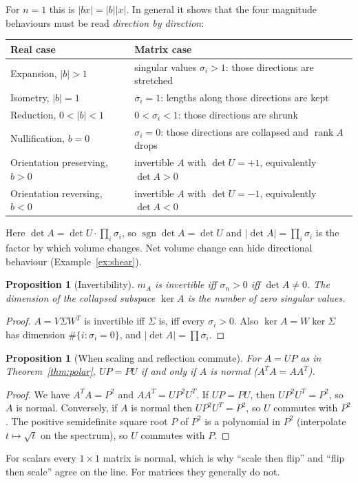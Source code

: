 \documentclass[12pt]{article}
\newtheorem{proposition}[theorem]{Proposition}
\theoremstyle{definition}
\theoremstyle{remark}
\newcommand{\sgn}{\operatorname{sgn}}
\newcommand{\rank}{\operatorname{rank}}
\begin{document}
\noindent For $n=1$ this is $|bx|=|b||x|$. In general it shows that the four magnitude behaviours must be read \emph{direction by direction}:

\begin{center}
\begin{tabular}{@{}p{}p{}@{}}
\toprule
Real case & Matrix case\\\midrule
Expansion, $|b|>1$ & singular values $\sigma_i>1$: those directions are stretched\\
Isometry, $|b|=1$ & $\sigma_i=1$: lengths along those directions are kept\\
Reduction, $0<|b|<1$ & $0<\sigma_i<1$: those directions are shrunk\\
Nullification, $b=0$ & $\sigma_i=0$: those directions are collapsed and $\rank A$ drops\\
Orientation preserving, $b>0$ & invertible $A$ with $\det U=+1$, equivalently $\det A>0$\\
Orientation reversing, $b<0$ & invertible $A$ with $\det U=-1$, equivalently $\det A<0$\\\bottomrule
\end{tabular}
\end{center}
Here $\det A=\det U\cdot\prod_i\sigma_i$, so $\sgn\det A=\det U$ and $|\det A|=\prod_i\sigma_i$ is the factor by which volume changes. Net volume change can hide directional behaviour (Example~\ref{ex:shear}).

\begin{proposition}[Invertibility]\label{prop:invertible}
$m_A$ is invertible iff $\sigma_n>0$ iff $\det A\ne0$. The dimension of the collapsed subspace $\ker A$ is the number of zero singular values.
\end{proposition}
\begin{proof}
$A=V\Sigma W^T$ is invertible iff $\Sigma$ is, iff every $\sigma_i>0$. Also $\ker A=W\ker\Sigma$ has dimension $\#\{i:\sigma_i=0\}$, and $|\det A|=\prod\sigma_i$.
\end{proof}

\begin{proposition}[When scaling and reflection commute]\label{prop:commute}
For $A=UP$ as in Theorem~\ref{thm:polar}, $UP=PU$ if and only if $A$ is normal ($A^TA=AA^T$).
\end{proposition}
\begin{proof}
We have $A^TA=P^2$ and $AA^T=UP^2U^T$. If $UP=PU$, then $UP^2U^T=P^2$, so $A$ is normal. Conversely, if $A$ is normal then $UP^2U^T=P^2$, so $U$ commutes with $P^2$. The positive semidefinite square root $P$ of $P^2$ is a polynomial in $P^2$ (interpolate $t\mapsto\sqrt t$ on the spectrum), so $U$ commutes with $P$.
\end{proof}
For scalars every $1\times1$ matrix is normal, which is why ``scale then flip'' and ``flip then scale'' agree on the line. For matrices they generally do not.
\end{document}

